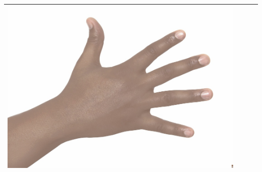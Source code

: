 \begin{longtable}{|N||c|c|c|}
  \begin{minipage}{.29\textwidth}
    \includegraphics[width=\textwidth,height=\textheight,keepaspectratio]{../rc_test/outputs/debug/hand_dark_to_hand_pale.jpg}
  \end{minipage} \\
\hline
 \end{longtable}